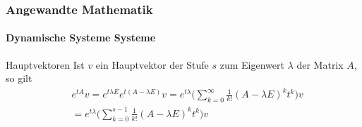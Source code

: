 \documentclass{beamer}
\begin{document}
\begin{frame}
    \frametitle{Angewandte Mathematik}
\framesubtitle{Dynamische Systeme Systeme}
\begin{block}{Hauptvektoren}
Ist $v$ ein Hauptvektor der Stufe $s$ zum Eigenwert $\lambda$ der Matrix $A$, so gilt
\begin{align*}
& e^{tA}v = e^{t \lambda E} e^{t(A - \lambda E)} v = e^{t \lambda}  \biggl( \sum_{k=0}^{\infty} \frac{1}{k!} (A - \lambda E)^k t^k \biggr) v \\
& =  e^{t \lambda}  \biggl ( \sum_{k=0}^{s -1} \frac{1}{k!} (A - \lambda E)^k t^k \biggr) v 
\end{align*}

\end{block}

 \end{frame}
\end{document}
